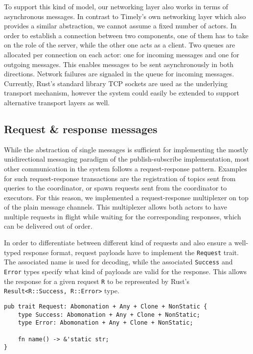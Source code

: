 To support this kind of model, our networking layer also works in terms of
asynchronous messages. In contrast to Timely's own networking layer which also
provides a similar abstraction, we cannot assume a fixed number of actors.
In order to establish a connection between two components, one of them has to
take on the role of the server, while the other one acts as a client. Two
queues are allocated per connection on each actor: one for incoming messages
and one for outgoing messages. This enables messages to be sent asynchronously
in both directions. Network failures are signaled in the queue for incoming
messages. Currently, Rust's standard library TCP sockets are used as the
underlying transport mechanism, however the system could easily be extended to
support alternative transport layers as well.

\subsection{Request \& response messages} \label{sec:reqresp}

While the abstraction of single messages is sufficient for implementing the
mostly unidirectional messaging paradigm of the publish-subscribe implementation,
most other communication in the system follows a request-response pattern. Examples
for such request-response transactions are the registration of topics sent from
queries to the coordinator, or spawn requests sent from the coordinator to
executors. For this reason, we implemented a request-response multiplexer on
top of the plain message channels. This multiplexer allows both actors to have
multiple requests in flight while waiting for the corresponding responses,
which can be delivered out of order.

In order to differentiate between different kind of requests and also ensure a
well-typed response format, request payloads have to implement the \lstinline{Request}
trait. The associated name is used for decoding, while the associated \lstinline{Success}
and \lstinline{Error} types specify what kind of payloads are valid for the response.
This allows the response for a given request \lstinline{R} to be represented by
Rust's \lstinline{Result<R::Success, R::Error>} type.

\begin{lstlisting}[caption={[Request trait]In order for a type to be used as a
request message, it needs to implement the \lstinline{Request} trait. The name allows
request handlers to differentiate between different types of requests, while the associated
types forces them to issue well-formed responses.
The trait bounds are explained in section \ref{sec:serialization}.}]
pub trait Request: Abomonation + Any + Clone + NonStatic {
    type Success: Abomonation + Any + Clone + NonStatic;
    type Error: Abomonation + Any + Clone + NonStatic;

    fn name() -> &'static str;
}
\end{lstlisting}

